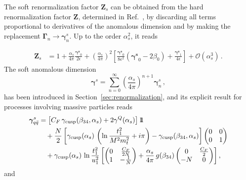 \documentclass[a4paper,11pt]{article}
\newcommand{\unitop}{{\boldmath{1\!\!1}}}
\newcommand{\as}{{\alpha_s}}
\newcommand{\bfZ}{\bm{Z}}
\newcommand{\bfgamma}{\bm{\gamma}}
\newcommand{\bfGamma}{\bm{\Gamma}}
\numberwithin{equation}{section}
\begin{document}
The soft renormalization factor $\bfZ_s$ can be obtained from the hard
renormalization factor $\bfZ$, determined in Ref.~\cite{Becher:2009cu}, by
discarding all terms proportional to derivatives of the anomalous dimension and
by making the replacement $\bfGamma_n \to \bfgamma^s_n$. 
%
Up to the order $\alpha_s^2$, it reads 
%

\begin{align}
  \bfZ_s & = 1 + \frac{\as}{4\pi} 
  \frac{\bm{\bfgamma^s}_0}{2\epsilon}
  + \left( \frac{\as}{4\pi} \right)^2 \left[
  \frac{\bm{\bfgamma^s}_0}{8\epsilon^2} 
  \left( \bm{\bfgamma^s}_0 -2\beta_0 \right) 
  + \frac{\bm{\bfgamma^s}_1}{4\epsilon} \right] + \mathcal{O}(\alpha_s^3) \,.
\end{align}
%
The soft anomalous dimension
%
\begin{equation}
  \bfgamma^s  = \sum_{n=0}^\infty 
  \left(\frac{\as}{4\pi}\right)^{n+1}\bfgamma^s_n\,,
\end{equation}
%
has been introduced in
Section~\ref{sec:renormalization}, and its explicit result for processes
involving massive particles reads~\cite{Ahrens:2010zv}
%
\begin{align}
  \bfgamma^s_{q\bar{q}} &= 
  \left[ 
  C_F \,
  \gamma_{\text{cusp}}(\beta_{34},\alpha_s) + 
  2\gamma^Q(\alpha_s) \right] \unitop \nonumber
  \\
  &\quad\mbox{} + \frac{N}{2} \left[ \gamma_{\text{cusp}}(\alpha_s) \, \left(
      \ln\frac{t_1^2}{M^2m_t^2} + i\pi \right) - \gamma_{\text{cusp}}(\beta_{34},\alpha_s)
  \right]
  \begin{pmatrix}
    0 & 0
    \\
    0 & 1
  \end{pmatrix}
  \nonumber
  \\
  &\quad\mbox{} + \gamma_{\text{cusp}}(\alpha_s) \, \ln\frac{t_1^2}{u_1^2} \left[
    \begin{pmatrix}
      0 & \frac{C_F}{2N}
      \\
      1 & -\frac{1}{N}
    \end{pmatrix}
    + \frac{\alpha_s}{4\pi} \, g(\beta_{34})
    \begin{pmatrix}
      0 & \frac{C_F}{2}
      \\
      -N & 0
    \end{pmatrix}
  \right] , 
\end{align}
%
and 
%
\end{document}
